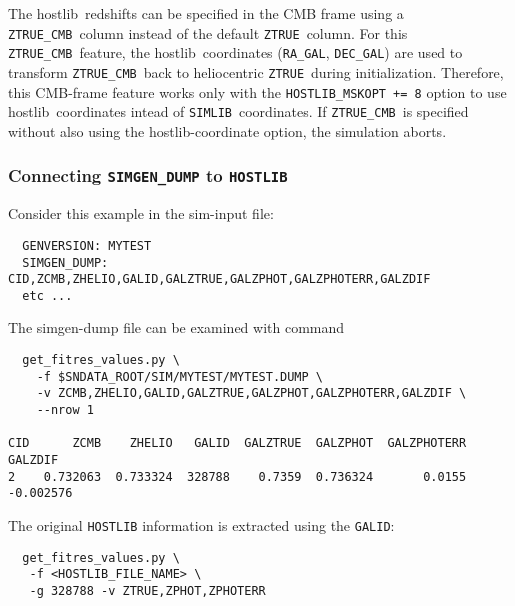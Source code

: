 \documentclass[12pt]{article}
\newcommand{\simlib}{{\tt SIMLIB}}
\newcommand{\hostlib}{{\sc hostlib}}
\newcommand{\ztruecmb}{{\tt ZTRUE\_CMB}}
\newcommand{\ztrue}{{\tt ZTRUE}}
\begin{document}
{The \hostlib\ redshifts can be specified in the CMB frame using a
\ztruecmb\ column instead of the default \ztrue\ column.
For this \ztruecmb\ feature, the \hostlib\ coordinates 
({\tt RA\_GAL}, {\tt DEC\_GAL}) are used to transform
\ztruecmb\ back to heliocentric \ztrue\ during initialization.
Therefore, this CMB-frame feature works only with the {\tt HOSTLIB\_MSKOPT += 8}
option to use \hostlib\ coordinates intead of \simlib\ coordinates.
If \ztruecmb\ is specified without also using the
{\hostlib}-coordinate option, the simulation aborts.



\clearpage
\subsubsection{Connecting {\tt SIMGEN\_DUMP} to {\tt HOSTLIB} }
\label{sss:dump_to_hostlib}

Consider this example in the sim-input file:
\begin{verbatim}
  GENVERSION: MYTEST
  SIMGEN_DUMP: CID,ZCMB,ZHELIO,GALID,GALZTRUE,GALZPHOT,GALZPHOTERR,GALZDIF
  etc ...
\end{verbatim}
%
The simgen-dump file can be examined with command
\begin{verbatim}
  get_fitres_values.py \
    -f $SNDATA_ROOT/SIM/MYTEST/MYTEST.DUMP \
    -v ZCMB,ZHELIO,GALID,GALZTRUE,GALZPHOT,GALZPHOTERR,GALZDIF \
    --nrow 1

CID      ZCMB    ZHELIO   GALID  GALZTRUE  GALZPHOT  GALZPHOTERR   GALZDIF
2    0.732063  0.733324  328788    0.7359  0.736324       0.0155 -0.002576
\end{verbatim}

The original {\tt HOSTLIB} information is extracted using the
{\tt GALID}:
\begin{verbatim}
  get_fitres_values.py \
   -f <HOSTLIB_FILE_NAME> \
   -g 328788 -v ZTRUE,ZPHOT,ZPHOTERR
        

\end{verbatim}}
\end{document}
